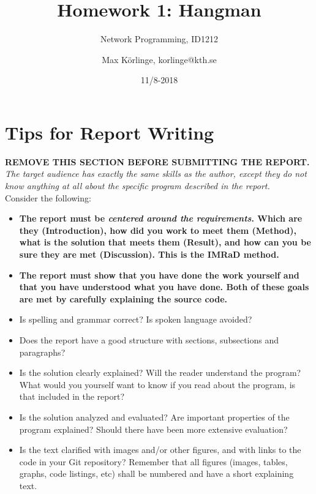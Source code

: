 \documentclass[a4paper]{scrartcl}
\title{Homework 1: Hangman}
\subtitle{Network Programming, ID1212}
\author{Max Körlinge, korlinge@kth.se}
\date{11/8-2018}
\begin{document}
\maketitle

\section*{Tips for Report Writing}
\textbf{REMOVE THIS SECTION BEFORE SUBMITTING THE REPORT.}\\

\noindent \textit{The target audience has exactly the same skills as the author, except they do not know anything at all about the specific program described in the report.} \\

Consider the following:

\begin{itemize}
  \item \textbf{The report must be \textit{centered around the requirements}. Which are they (Introduction), how did you work to meet them (Method), what is the solution that meets them (Result), and how can you be sure they are met (Discussion). This is the IMRaD method.}

  \item \textbf{The report must show that you have done the work yourself and that you have understood what you have done. Both of these goals are met by carefully explaining the source code.}

  \item Is spelling and grammar correct? Is spoken language avoided?

  \item Does the report have a good structure with sections, subsections and paragraphs?

  \item Is the solution clearly explained? Will the reader understand the program? What would you yourself want to know if you read about the program, is that included in the report?

  \item Is the solution analyzed and evaluated? Are important properties of the program explained? Should there have been more extensive evaluation?

  \item Is the text clarified with images and/or other figures, and with links to the code in your Git repository? Remember that all figures (images, tables, graphs, code listings, etc) shall be numbered and have a short explaining text.
\end{itemize}
\end{document}
